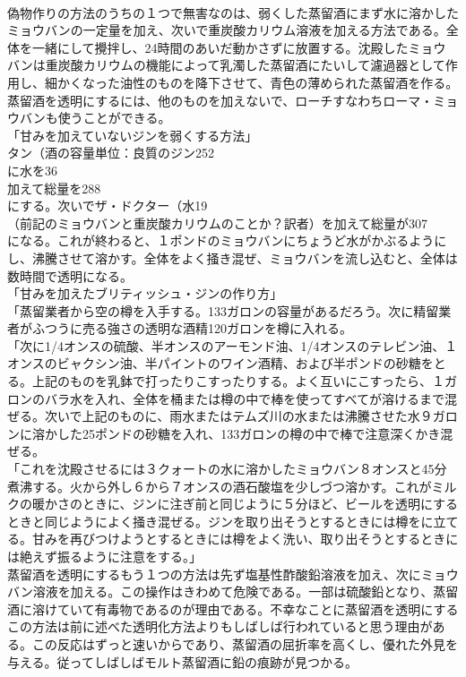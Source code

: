 \documentclass[8pt]{extreport}
\begin{document}
\begin{CJK}{UTF8}{min}
\\	偽物作りの方法のうちの１つで無害なのは、弱くした蒸留酒にまず水に溶かしたミョウバンの一定量を加え、次いで重炭酸カリウム溶液を加える方法である。全体を一緒にして攪拌し、24時間のあいだ動かさずに放置する。沈殿したミョウバンは重炭酸カリウムの機能によって乳濁した蒸留酒にたいして濾過器として作用し、細かくなった油性のものを降下させて、青色の薄められた蒸留酒を作る。蒸留酒を透明にするには、他のものを加えないで、ローチすなわちローマ・ミョウバンも使うことができる。
\\	「甘みを加えていないジンを弱くする方法」
\\	タン（酒の容量単位：良質のジン252
\\	に水を36
\\	加えて総量を288
\\	にする。次いでザ・ドクター（水19
\\	（前記のミョウバンと重炭酸カリウムのことか？訳者）を加えて総量が307
\\	になる。これが終わると、１ポンドのミョウバンにちょうど水がかぶるようにし、沸騰させて溶かす。全体をよく掻き混ぜ、ミョウバンを流し込むと、全体は数時間で透明になる。
\\	「甘みを加えたブリティッシュ・ジンの作り方」
\\	「蒸留業者から空の樽を入手する。133ガロンの容量があるだろう。次に精留業者がふつうに売る強さの透明な酒精120ガロンを樽に入れる。
\\	「次に1/4オンスの硫酸、半オンスのアーモンド油、1/4オンスのテレビン油、１オンスのビャクシン油、半パイントのワイン酒精、および半ポンドの砂糖をとる。上記のものを乳鉢で打ったりこすったりする。よく互いにこすったら、１ガロンのバラ水を入れ、全体を桶または樽の中で棒を使ってすべてが溶けるまで混ぜる。次いで上記のものに、雨水またはテムズ川の水または沸騰させた水９ガロンに溶かした25ポンドの砂糖を入れ、133ガロンの樽の中で棒で注意深くかき混ぜる。
\\	「これを沈殿させるには３クォートの水に溶かしたミョウバン８オンスと45分煮沸する。火から外し６から７オンスの酒石酸塩を少しづつ溶かす。これがミルクの暖かさのときに、ジンに注ぎ前と同じように５分ほど、ビールを透明にするときと同じようによく掻き混ぜる。ジンを取り出そうとするときには樽をに立てる。甘みを再びつけようとするときには樽をよく洗い、取り出そうとするときには絶えず振るように注意をする。」
\\	蒸留酒を透明にするもう１つの方法は先ず塩基性酢酸鉛溶液を加え、次にミョウバン溶液を加える。この操作はきわめて危険である。一部は硫酸鉛となり、蒸留酒に溶けていて有毒物であるのが理由である。不幸なことに蒸留酒を透明にするこの方法は前に述べた透明化方法よりもしばしば行われていると思う理由がある。この反応はずっと速いからであり、蒸留酒の屈折率を高くし、優れた外見を与える。従ってしばしばモルト蒸留酒に鉛の痕跡が見つかる。

\end{CJK}
\end{document}
